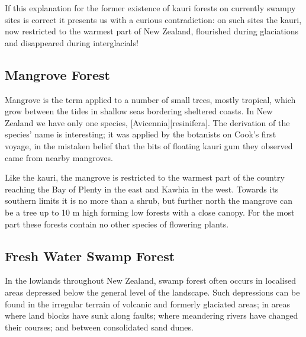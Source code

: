 If this explanation for the former existence of kauri forests on currently swampy sites is correct it presents us with a curious contradiction: on such sites the kauri, now restricted to the warmest part of New Zealand, flourished during glaciations and disappeared during interglacials!

\subsection{Mangrove Forest}

Mangrove is the term applied to a number of small trees, mostly tropical, which grow between the tides in shallow seas bordering sheltered coasts.
In New Zealand we have only one species, [Avicennia][resinifera].
The derivation of the species' name is interesting; it was applied by the botanists on Cook's first voyage, in the mistaken belief that the bits of floating kauri gum they observed came from nearby mangroves.

Like the kauri, the mangrove is restricted to the warmest part of the country reaching the Bay of Plenty in the east and Kawhia in the west.
Towards its southern limits it is no more than a shrub, but further north the mangrove can be a tree up to 10 m high forming low forests with a close canopy.
For the most part these forests contain no other species of flowering plants.

\subsection{Fresh Water Swamp Forest}

In the lowlands throughout New Zealand, swamp forest often occurs in localised areas depressed below the general level of the landscape.
Such depressions can be found in the irregular terrain of volcanic and formerly glaciated areas; in areas where land blocks have sunk along faults; where meandering rivers have changed their courses; and between consolidated sand dunes.

